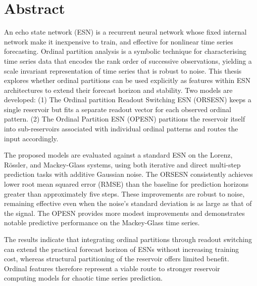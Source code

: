\chapter*{Abstract}

An echo state network (ESN) is a recurrent neural network whose fixed internal network make it inexpensive to train, and effective for nonlinear time series forecasting. Ordinal partition analysis is a symbolic technique for characterising time series data that encodes the rank order of successive observations, yielding a scale invariant representation of time series that is robust to noise. This thesis explores whether ordinal partitions can be used explicitly as features within ESN architectures to extend their forecast horizon and stability. Two models are developed: (1) The Ordinal partition Readout Switching ESN (ORSESN) keeps a single reservoir but fits a separate readout vector for each observed ordinal pattern. (2) The Ordinal Partition ESN (OPESN) partitions the reservoir itself into sub-reservoirs associated with individual ordinal patterns and routes the input accordingly.

The proposed models are evaluated against a standard ESN on the Lorenz, R\"{o}ssler, and Mackey-Glass systems, using both iterative and direct multi-step prediction tasks with additive Gaussian noise. The ORSESN consistently achieves lower root mean squared error (RMSE) than the baseline for prediction horizons greater than approximately five steps.
These improvements are robust to noise, remaining effective even when the noise's standard deviation is as large as that of the signal.
The OPESN provides more modest improvements and demonstrates notable predictive performance on the Mackey-Glass time series.

The results indicate that integrating ordinal partitions through readout switching can extend the practical forecast horizon of ESNs without increasing training cost, whereas structural partitioning of the reservoir offers limited benefit. Ordinal features therefore represent a viable route to stronger reservoir computing models for chaotic time series prediction.
